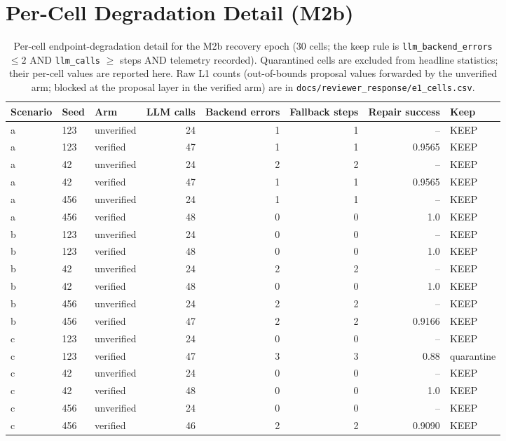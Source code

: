 \documentclass[11pt,a4paper]{article}
\begin{document}
\appendix
\section{Per-Cell Degradation Detail (M2b)}
\label{app:detail}

\begin{table}[htbp]
\centering
\caption{Per-cell endpoint-degradation detail for the M2b recovery epoch (30 cells; the keep rule is \texttt{llm\_backend\_errors} $\leq 2$ AND \texttt{llm\_calls} $\geq$ steps AND telemetry recorded). Quarantined cells are excluded from headline statistics; their per-cell values are reported here. Raw L1 counts (out-of-bounds proposal values forwarded by the unverified arm; blocked at the proposal layer in the verified arm) are in \texttt{docs/reviewer\_response/e1\_cells.csv}.}
\label{app:cells}
\begin{tabular}{lllrrrrl}
\toprule
Scenario & Seed & Arm & LLM calls & Backend errors & Fallback steps & Repair success & Keep \\
\midrule
a & 123 & unverified & 24 & 1 & 1 & -- & KEEP \\
a & 123 & verified & 47 & 1 & 1 & 0.9565 & KEEP \\
a & 42 & unverified & 24 & 2 & 2 & -- & KEEP \\
a & 42 & verified & 47 & 1 & 1 & 0.9565 & KEEP \\
a & 456 & unverified & 24 & 1 & 1 & -- & KEEP \\
a & 456 & verified & 48 & 0 & 0 & 1.0 & KEEP \\
b & 123 & unverified & 24 & 0 & 0 & -- & KEEP \\
b & 123 & verified & 48 & 0 & 0 & 1.0 & KEEP \\
b & 42 & unverified & 24 & 2 & 2 & -- & KEEP \\
b & 42 & verified & 48 & 0 & 0 & 1.0 & KEEP \\
b & 456 & unverified & 24 & 2 & 2 & -- & KEEP \\
b & 456 & verified & 47 & 2 & 2 & 0.9166 & KEEP \\
c & 123 & unverified & 24 & 0 & 0 & -- & KEEP \\
c & 123 & verified & 47 & 3 & 3 & 0.88 & quarantine \\
c & 42 & unverified & 24 & 0 & 0 & -- & KEEP \\
c & 42 & verified & 48 & 0 & 0 & 1.0 & KEEP \\
c & 456 & unverified & 24 & 0 & 0 & -- & KEEP \\
c & 456 & verified & 46 & 2 & 2 & 0.9090 & KEEP \\

\end{tabular}
\end{table}
\end{document}
